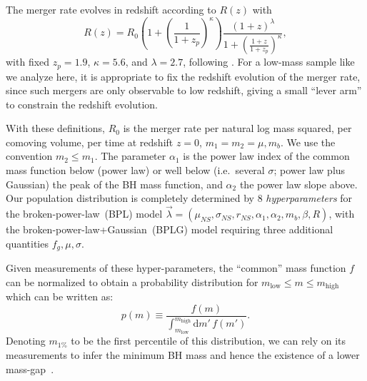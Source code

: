 \documentclass[modern]{aastex631}
\newcommand{\dd}{\ensuremath{\mathrm{d}}}
\begin{document}
The merger rate evolves in redshift according to $R(z)$ with 
\begin{equation}
    R(z) = R_0 \left( 1 + \left( \frac{1}{1 + z_p} \right)^\kappa \right) \frac{\left( 1 + z \right)^\lambda}{1 + \left( \frac{1+z}{1+z_p} \right)^\kappa}, 
\end{equation}
with fixed $z_p = 1.9$, $\kappa = 5.6$, and $\lambda = 2.7$, following
\citet{Madau2014}.  For a low-mass sample like we analyze here, it is
appropriate to fix the redshift evolution of the merger rate, since such mergers
are only observable to low redshift, giving a small ``lever arm'' to constrain
the redshift evolution.

With these definitions, $R_0$ is the merger rate per natural log mass squared,
per comoving volume, per time at redshift $z = 0$, $m_1 = m_2 = \mu, m_b$.  We
use the convention $m_2 \leq m_1$.  The parameter $\alpha_1$ is the power law
index of the common mass function below (power law) or well below (i.e.\ several
$\sigma$; power law plus Gaussian) the peak of the BH mass function, and
$\alpha_2$ the power law slope above.  Our population distribution is completely
determined by 8 \textit{hyperparameters} for the broken-power-law~(BPL) model
$\vec{\lambda}=(\mu_{NS}, \sigma_{NS}, r_{NS}, \alpha_1,\alpha_2,m_b, \beta,
R)$, with the broken-power-law+Gaussian~(BPLG) model requiring three additional
quantities $f_g,\mu,\sigma$.

Given measurements of these hyper-parameters, the ``common'' mass function $f$ can be normalized to obtain a probability distribution
for $m_\mathrm{low} \leq m \leq m_\mathrm{high}$ which can be written as:
\begin{equation}
    \label{eq:pm-definition}
    p(m) \equiv \frac{f(m)}{\int_{m_\mathrm{low}}^{m_\mathrm{high}} \dd m' \, f(m')}.
\end{equation}
\noindent Denoting $m_{1\%}$ to be the first percentile of this distribution, we can rely on its measurements to infer the minimum BH mass and hence the existence of a lower mass-gap~\citep{Farr:2010tu}. 
\end{document}
